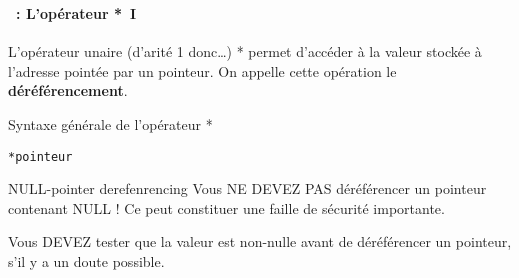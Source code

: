 \begin{frame}[containsverbatim]
  \frametitle{\secname}
  \framesubtitle{\subsecname~: L'opérateur *~I}

  L'opérateur unaire (d'arité 1 donc\ldots) * permet d'accéder à la valeur stockée à l'adresse pointée par un pointeur. On appelle cette 
  opération le \textbf{déréférencement}.
  
  \begin{block}{Syntaxe générale de l'opérateur *}
    \begin{verbatim}
*pointeur\end{verbatim}
  \end{block}
  
  \begin{alertblock}{NULL-pointer derefenrencing}
    Vous NE DEVEZ PAS déréférencer un pointeur contenant NULL ! Ce peut constituer une faille de sécurité importante.
    \par
    Vous DEVEZ tester que la valeur est non-nulle avant de déréférencer un pointeur, s'il y a un doute possible.  
  \end{alertblock}
\end{frame}

